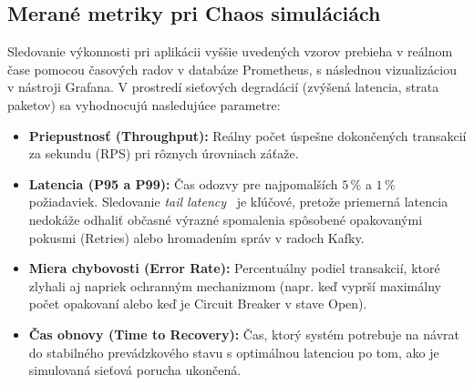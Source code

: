 \subsection{Merané metriky pri Chaos simuláciách} \label{s: metriky}
Sledovanie výkonnosti pri aplikácii vyššie uvedených vzorov prebieha v reálnom čase pomocou časových radov v databáze Prometheus, s následnou vizualizáciou v nástroji Grafana. V prostredí sieťových degradácií (zvýšená latencia, strata paketov) sa vyhodnocujú nasledujúce parametre:
\begin{itemize}
\item \textbf{Priepustnosť (Throughput):} Reálny počet úspešne dokončených transakcií za sekundu (RPS) pri rôznych úrovniach záťaže.
\item \textbf{Latencia (P95 a P99):} Čas odozvy pre najpomalších $5\,\%$ a $1\,\%$ požiadaviek. Sledovanie \textit{tail latency}~\cite{Dean2013} je kľúčové, pretože priemerná latencia nedokáže odhaliť občasné výrazné spomalenia spôsobené opakovanými pokusmi (Retries) alebo hromadením správ v radoch Kafky.
\item \textbf{Miera chybovosti (Error Rate):} Percentuálny podiel transakcií, ktoré zlyhali aj napriek ochranným mechanizmom (napr. keď vyprší maximálny počet opakovaní alebo keď je Circuit Breaker v stave Open).
\item \textbf{Čas obnovy (Time to Recovery):} Čas, ktorý systém potrebuje na návrat do stabilného prevádzkového stavu s optimálnou latenciou po tom, ako je simulovaná sieťová porucha ukončená.
\end{itemize}